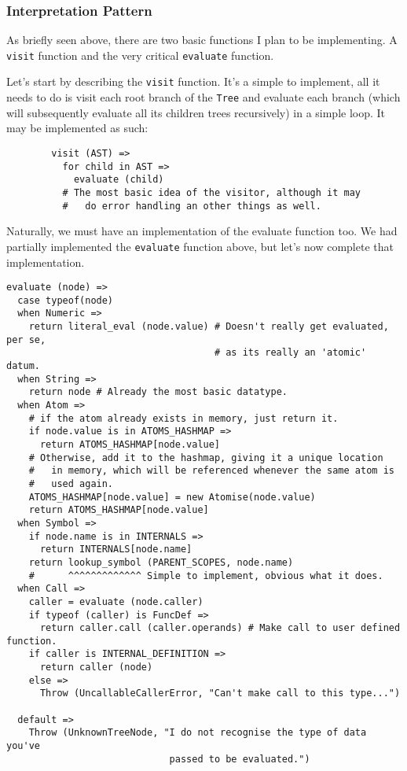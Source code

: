 \documentclass{article}
\newcommand{\code}[1]{\texttt{#1}}
\begin{document}
    \subsubsection{Interpretation Pattern}
      As briefly seen above, there are two basic functions I plan to be
      implementing.  A \code{visit} function and the very critical \code{evaluate}
      function.

      Let's start by describing the \code{visit} function. It's a simple to
      implement, all it needs to do is visit each root branch of the \code{Tree}
      and evaluate each branch (which will subsequently evaluate all its children
      trees recursively) in a simple loop. It may be implemented as such:

      \begin{verbatim}
        visit (AST) =>
          for child in AST =>
            evaluate (child)
          # The most basic idea of the visitor, although it may
          #   do error handling an other things as well.
      \end{verbatim}

      Naturally, we must have an implementation of the evaluate function too.
      We had partially implemented the \code{evaluate} function above, but let's
      now complete that implementation.

      \clearpage

      \begin{verbatim}
evaluate (node) =>
  case typeof(node)
  when Numeric =>
    return literal_eval (node.value) # Doesn't really get evaluated, per se,
                                     # as its really an 'atomic' datum.
  when String =>
    return node # Already the most basic datatype.
  when Atom =>
    # if the atom already exists in memory, just return it.
    if node.value is in ATOMS_HASHMAP =>
      return ATOMS_HASHMAP[node.value]
    # Otherwise, add it to the hashmap, giving it a unique location
    #   in memory, which will be referenced whenever the same atom is
    #   used again.
    ATOMS_HASHMAP[node.value] = new Atomise(node.value)
    return ATOMS_HASHMAP[node.value]
  when Symbol =>
    if node.name is in INTERNALS =>
      return INTERNALS[node.name]
    return lookup_symbol (PARENT_SCOPES, node.name)
    #      ^^^^^^^^^^^^^ Simple to implement, obvious what it does.
  when Call =>
    caller = evaluate (node.caller)
    if typeof (caller) is FuncDef =>
      return caller.call (caller.operands) # Make call to user defined function.
    if caller is INTERNAL_DEFINITION =>
      return caller (node)
    else =>
      Throw (UncallableCallerError, "Can't make call to this type...")

  default =>
    Throw (UnknownTreeNode, "I do not recognise the type of data you've
                             passed to be evaluated.")
      \end{verbatim}
\end{document}
